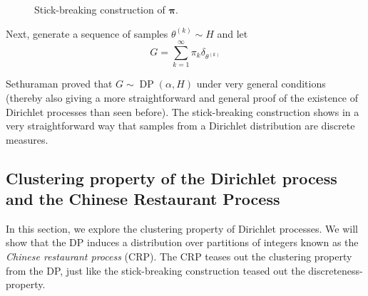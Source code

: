 \documentclass[final,3p,times,twocolumn]{elsarticle}
\DeclareMathOperator*{\DP}{DP}
\DeclareMathOperator*{\Beta}{Beta}
\let\bs\boldsymbol
\begin{document}
\begin{figure}
\caption{Stick-breaking construction of $\bs \pi$.}
\label{fig:stick}
\end{figure}

Next, generate a sequence of samples $\theta^{(k)} \sim H$ and let
\begin{equation}
G = \sum_{k=1}^\infty \pi_k \delta_{\theta^{(k)}}
\end{equation}

Sethuraman \cite{sethuraman94} proved that $G \sim \DP(\alpha,H)$ under very general conditions (thereby also giving a more straightforward and general proof of the existence of Dirichlet processes than seen before).
The stick-breaking construction shows in a very straightforward way that samples from a Dirichlet distribution are discrete measures.

\subsection{Clustering property of the Dirichlet process and the Chinese Restaurant Process}
\label{sect:crp}
In this section, we explore the clustering property of Dirichlet processes.
We will show that the DP induces a distribution over partitions of integers known as the \emph{Chinese restaurant process} (CRP).
The CRP teases out the clustering property from the DP, just like the stick-breaking construction teased out the discreteness-property.
\end{document}
